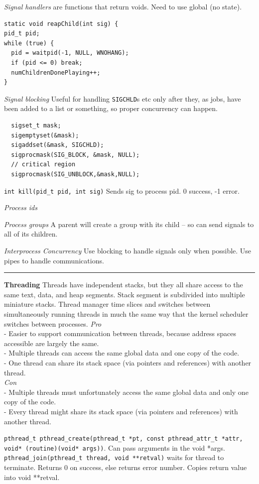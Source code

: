 \documentclass{article}
\begin{document}
\begin{multicols}{2}
  {\it Signal handlers} are functions that return voids. Need to use global (no
  state).
  \begin{verbatim}
static void reapChild(int sig) {
pid_t pid;
while (true) {
  pid = waitpid(-1, NULL, WNOHANG);
  if (pid <= 0) break;
  numChildrenDonePlaying++;
} \end{verbatim}
  {\it Signal blocking} Useful for handling \texttt{SIGCHLD}s etc only after they, as
  jobs, have been added to a list or something, so proper concurrency can
  happen.
  \begin{verbatim}
  sigset_t mask;
  sigemptyset(&mask);
  sigaddset(&mask, SIGCHLD);
  sigprocmask(SIG_BLOCK, &mask, NULL);
  // critical region
  sigprocmask(SIG_UNBLOCK,&mask,NULL);\end{verbatim}

  {\tt int kill(pid\_t pid, int sig)} Sends sig to process pid. 0 success, -1
  error.

  {\it Process ids} %

  {\it Process groups} A parent will create a group with its child -- so can
  send signals to all of its children.

  {\it Interprocess Concurrency} Use blocking to handle signals only when
  possible. Use pipes to handle communications.

  \noindent\rule{4cm}{0.4pt}

  {\bf Threading}
  Threads have independent stacks, but they all share access to the same text,
  data, and heap segments. Stack segment is subdivided into multiple miniature
  stacks. Thread manager time slices and switches between simultaneously running
  threads in much the same way that the kernel scheduler switches between
  processes.
  {\it Pro}\\
  - Easier to support communication between threads, because address spaces
  accessible are largely the same.\\
  - Multiple threads can access the same global data and one copy of the code.\\
  - One thread can share its stack space (via pointers and references) with
  another thread.\\
  {\it Con}\\
  - Multiple threads must unfortunately access the same global data and only one
  copy of the code.\\
  - Every thread might share its stack space (via pointers and references) with
  another thread.

  {\tt pthread\_t pthread\_create(pthread\_t *pt, const pthread\_attr\_t *attr,
  void* (routine)(void* args))}. Can pass arguments in the void *args.\\
  {\tt pthread\_join(pthread\_t thread, void **retval)} waits for thread to
  terminate. Returns 0 on success, else returns error number. Copies return
  value into void **retval.


\end{multicols}
\end{document}
